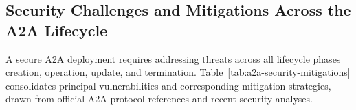\documentclass{article}
\begin{document}
  


\subsection{Security Challenges and Mitigations Across the A2A Lifecycle}

A secure A2A deployment requires addressing threats across all lifecycle phases creation, operation, update, and termination. Table~\ref{tab:a2a-security-mitigations} consolidates principal vulnerabilities and corresponding mitigation strategies, drawn from official A2A protocol references and recent security analyses.




\end{document}
